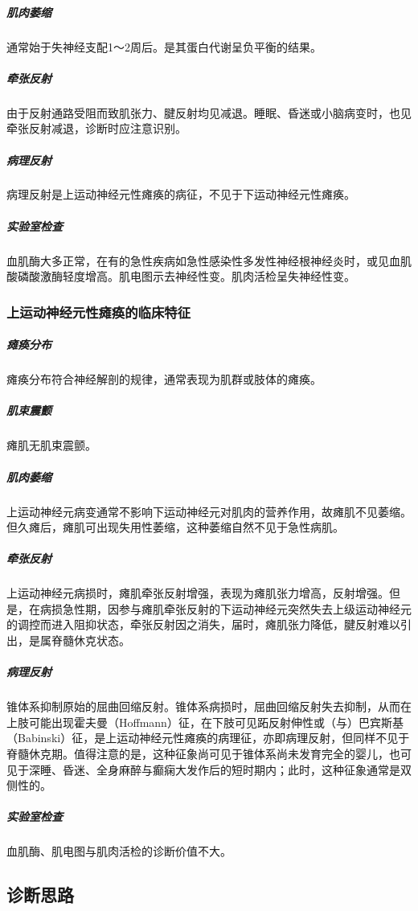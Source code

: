 \subparagraph{肌肉萎缩}

通常始于失神经支配1～2周后。是其蛋白代谢呈负平衡的结果。

\subparagraph{牵张反射}

由于反射通路受阻而致肌张力、腱反射均见减退。睡眠、昏迷或小脑病变时，也见牵张反射减退，诊断时应注意识别。

\subparagraph{病理反射}

病理反射是上运动神经元性瘫痪的病征，不见于下运动神经元性瘫痪。

\subparagraph{实验室检查}

血肌酶大多正常，在有的急性疾病如急性感染性多发性神经根神经炎时，或见血肌酸磷酸激酶轻度增高。肌电图示去神经性变。肌肉活检呈失神经性变。

\subsubsection{上运动神经元性瘫痪的临床特征}

\subparagraph{瘫痪分布}

瘫痪分布符合神经解剖的规律，通常表现为肌群或肢体的瘫痪。

\subparagraph{肌束震颤}

瘫肌无肌束震颤。

\subparagraph{肌肉萎缩}

上运动神经元病变通常不影响下运动神经元对肌肉的营养作用，故瘫肌不见萎缩。但久瘫后，瘫肌可出现失用性萎缩，这种萎缩自然不见于急性病肌。

\subparagraph{牵张反射}

上运动神经元病损时，瘫肌牵张反射增强，表现为瘫肌张力增高，反射增强。但是，在病损急性期，因参与瘫肌牵张反射的下运动神经元突然失去上级运动神经元的调控而进入阻抑状态，牵张反射因之消失，届时，瘫肌张力降低，腱反射难以引出，是属脊髓休克状态。

\subparagraph{病理反射}

锥体系抑制原始的屈曲回缩反射。锥体系病损时，屈曲回缩反射失去抑制，从而在上肢可能出现霍夫曼（Hoffmann）征，在下肢可见跖反射伸性或（与）巴宾斯基（Babinski）征，是上运动神经元性瘫痪的病理征，亦即病理反射，但同样不见于脊髓休克期。值得注意的是，这种征象尚可见于锥体系尚未发育完全的婴儿，也可见于深睡、昏迷、全身麻醉与癫痫大发作后的短时期内；此时，这种征象通常是双侧性的。

\subparagraph{实验室检查}

血肌酶、肌电图与肌肉活检的诊断价值不大。

\subsection{诊断思路}

